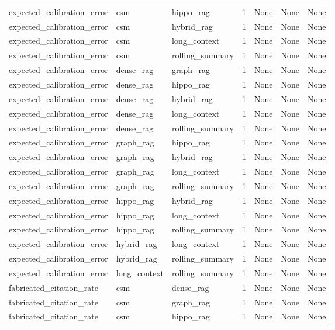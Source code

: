 \begin{tabular}{lllllll}
expected\_calibration\_error & csm & hippo\_rag & 1 & None & None & None \\
expected\_calibration\_error & csm & hybrid\_rag & 1 & None & None & None \\
expected\_calibration\_error & csm & long\_context & 1 & None & None & None \\
expected\_calibration\_error & csm & rolling\_summary & 1 & None & None & None \\
expected\_calibration\_error & dense\_rag & graph\_rag & 1 & None & None & None \\
expected\_calibration\_error & dense\_rag & hippo\_rag & 1 & None & None & None \\
expected\_calibration\_error & dense\_rag & hybrid\_rag & 1 & None & None & None \\
expected\_calibration\_error & dense\_rag & long\_context & 1 & None & None & None \\
expected\_calibration\_error & dense\_rag & rolling\_summary & 1 & None & None & None \\
expected\_calibration\_error & graph\_rag & hippo\_rag & 1 & None & None & None \\
expected\_calibration\_error & graph\_rag & hybrid\_rag & 1 & None & None & None \\
expected\_calibration\_error & graph\_rag & long\_context & 1 & None & None & None \\
expected\_calibration\_error & graph\_rag & rolling\_summary & 1 & None & None & None \\
expected\_calibration\_error & hippo\_rag & hybrid\_rag & 1 & None & None & None \\
expected\_calibration\_error & hippo\_rag & long\_context & 1 & None & None & None \\
expected\_calibration\_error & hippo\_rag & rolling\_summary & 1 & None & None & None \\
expected\_calibration\_error & hybrid\_rag & long\_context & 1 & None & None & None \\
expected\_calibration\_error & hybrid\_rag & rolling\_summary & 1 & None & None & None \\
expected\_calibration\_error & long\_context & rolling\_summary & 1 & None & None & None \\
fabricated\_citation\_rate & csm & dense\_rag & 1 & None & None & None \\
fabricated\_citation\_rate & csm & graph\_rag & 1 & None & None & None \\
fabricated\_citation\_rate & csm & hippo\_rag & 1 & None & None & None \\

\end{tabular}
